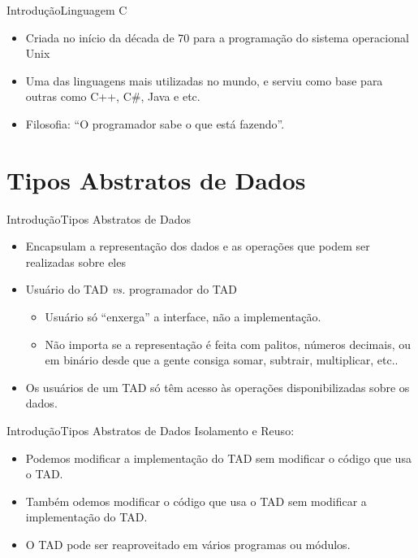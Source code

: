 \documentclass[aspectratio=169]{beamer}
\begin{document}

\begin{frame}{Introdução}{Linguagem C}
\begin{itemize}
\item Criada no início da década de 70 para a programação do 
sistema operacional Unix 
\item Uma das linguagens mais utilizadas no mundo, e serviu como base para outras como C++, C\#, Java e etc. 
\item Filosofia: ``O programador sabe o que está fazendo''.
\end{itemize}
\end{frame}

\section{Tipos Abstratos de Dados}

\begin{frame}{Introdução}{Tipos Abstratos de Dados}
\begin{itemize}
\item Encapsulam a representação dos dados e as operações que podem ser realizadas sobre eles
\item Usuário do TAD {\it vs.} programador do TAD
\begin{itemize}
\item Usuário só ``enxerga'' a interface, não a implementação.
\item Não importa se a representação é feita com palitos, números decimais, ou em binário desde que a gente consiga somar, subtrair, multiplicar, etc..
\end{itemize}
\item Os usuários de um TAD só têm acesso às operações disponibilizadas sobre os dados.
\end{itemize}
\end{frame}


\begin{frame}{Introdução}{Tipos Abstratos de Dados}
Isolamento e Reuso:
\begin{itemize}
\item Podemos modificar a implementação do TAD sem modificar o código que usa o TAD.
\item Também odemos modificar o código que usa o TAD sem modificar a implementação do TAD.
\item O TAD pode ser reaproveitado em vários programas ou módulos.
\end{itemize}
\end{frame}
\end{document}
